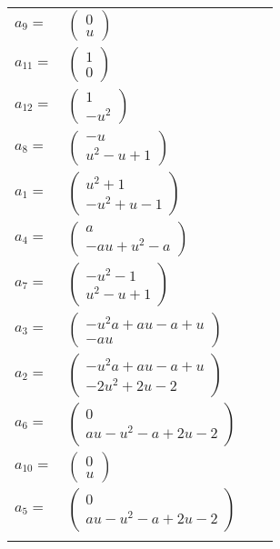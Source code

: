 \documentclass[1p]{elsarticle_modified}
\theoremstyle{definition}
\begin{document}
\begin{tabular}{m{7pt} m{180pt} m{7pt} m{180pt} }
\flushright $a_{9}=$&$\begin{pmatrix}0\\u\end{pmatrix}$ \\
\flushright $a_{11}=$&$\begin{pmatrix}1\\0\end{pmatrix}$ \\
\flushright $a_{12}=$&$\begin{pmatrix}1\\- u^2\end{pmatrix}$ \\
\flushright $a_{8}=$&$\begin{pmatrix}- u\\u^2- u+1\end{pmatrix}$ \\
\flushright $a_{1}=$&$\begin{pmatrix}u^2+1\\- u^2+u-1\end{pmatrix}$ \\
\flushright $a_{4}=$&$\begin{pmatrix}a\\- a u+u^2- a\end{pmatrix}$ \\
\flushright $a_{7}=$&$\begin{pmatrix}- u^2-1\\u^2- u+1\end{pmatrix}$ \\
\flushright $a_{3}=$&$\begin{pmatrix}- u^2 a+a u- a+u\\- a u\end{pmatrix}$ \\
\flushright $a_{2}=$&$\begin{pmatrix}- u^2 a+a u- a+u\\-2 u^2+2 u-2\end{pmatrix}$ \\
\flushright $a_{6}=$&$\begin{pmatrix}0\\a u- u^2- a+2 u-2\end{pmatrix}$ \\
\flushright $a_{10}=$&$\begin{pmatrix}0\\u\end{pmatrix}$ \\
\flushright $a_{5}=$&$\begin{pmatrix}0\\a u- u^2- a+2 u-2\end{pmatrix}$\\&\end{tabular}
\end{document}
